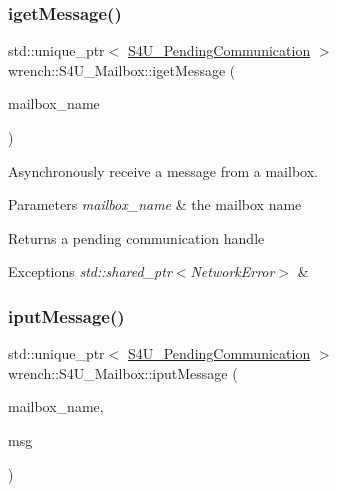 \subsubsection{\texorpdfstring{iget\+Message()}{igetMessage()}}
{\footnotesize\ttfamily std\+::unique\+\_\+ptr$<$ \hyperlink{classwrench_1_1_s4_u___pending_communication}{S4\+U\+\_\+\+Pending\+Communication} $>$ wrench\+::\+S4\+U\+\_\+\+Mailbox\+::iget\+Message (\begin{DoxyParamCaption}\item[{std\+::string}]{mailbox\+\_\+name }\end{DoxyParamCaption})\hspace{0.3cm}{\ttfamily [static]}}



Asynchronously receive a message from a mailbox. 


\begin{DoxyParams}{Parameters}
{\em mailbox\+\_\+name} & the mailbox name\\
\hline
\end{DoxyParams}
\begin{DoxyReturn}{Returns}
a pending communication handle
\end{DoxyReturn}

\begin{DoxyExceptions}{Exceptions}
{\em std\+::shared\+\_\+ptr$<$\+Network\+Error$>$} & \\
\hline
\end{DoxyExceptions}
\mbox{\label{classwrench_1_1_s4_u___mailbox_abeed7e0ee6ecb15155eec05571b84ef3}} 
\subsubsection{\texorpdfstring{iput\+Message()}{iputMessage()}}
{\footnotesize\ttfamily std\+::unique\+\_\+ptr$<$ \hyperlink{classwrench_1_1_s4_u___pending_communication}{S4\+U\+\_\+\+Pending\+Communication} $>$ wrench\+::\+S4\+U\+\_\+\+Mailbox\+::iput\+Message (\begin{DoxyParamCaption}\item[{std\+::string}]{mailbox\+\_\+name,  }\item[{\hyperlink{classwrench_1_1_simulation_message}{Simulation\+Message} $\ast$}]{msg }\end{DoxyParamCaption})\hspace{0.3cm}{\ttfamily [static]}}



